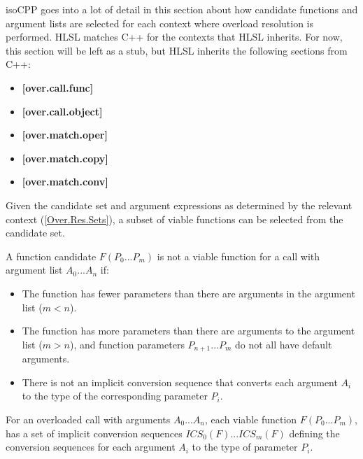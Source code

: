 \begin{note}
  \gls{isoCPP} goes into a lot of detail in this section about how candidate
  functions and argument lists are selected for each context where overload
  resolution is performed. HLSL matches C++ for the contexts that HLSL inherits.
  For now, this section will be left as a stub, but HLSL inherits the following
  sections from C++:
  \begin{itemize}
    \item \textbf{[over.call.func]}
    \item \textbf{[over.call.object]}
    \item \textbf{[over.match.oper]}
    \item \textbf{[over.match.copy]}
    \item \textbf{[over.match.conv]}
  \end{itemize}
\end{note}


\p Given the candidate set and argument expressions as determined by the
relevant context (\ref{Over.Res.Sets}), a subset of viable functions can be
selected from the candidate set.

\p A function candidate \(F(P_0 ... P_m)\) is not a viable function for a call
with argument list \(A_0 ... A_n\) if:
\begin{itemize}
  \item The function has fewer parameters than there are
  arguments in the argument list (\(m < n \)).
  \item The function has more parameters than there are arguments to the
  argument list (\(m > n \)), and function parameters \( P_{n+1} ... P_m \) do not
  all have default arguments.
  \item There is not an implicit conversion sequence that converts each argument
  \(A_i\) to the type of the corresponding parameter \(P_i\).
\end{itemize}


\p For an overloaded call with arguments \(A_0 ... A_n\), each viable function
\(F(P_0 ... P_m)\), has a set of implicit conversion sequences \(ICS_0(F) ...
ICS_m(F)\) defining the conversion sequences for each argument \(A_i\) to the
type of parameter \(P_i\).

